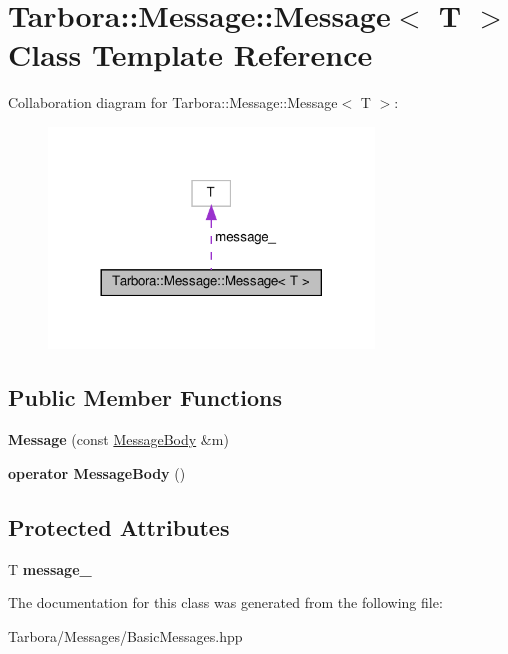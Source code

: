 \hypertarget{classTarbora_1_1Message_1_1Message}{}\section{Tarbora\+:\+:Message\+:\+:Message$<$ T $>$ Class Template Reference}
\label{classTarbora_1_1Message_1_1Message}


Collaboration diagram for Tarbora\+:\+:Message\+:\+:Message$<$ T $>$\+:\nopagebreak
\begin{figure}[H]
\begin{center}
\leavevmode
\includegraphics[width=245pt]{classTarbora_1_1Message_1_1Message__coll__graph}
\end{center}
\end{figure}
\subsection*{Public Member Functions}
\begin{DoxyCompactItemize}
\item 
\mbox{\label{classTarbora_1_1Message_1_1Message_a0c17b7278a56bc8793de569e5fc386b2}} 
{\bfseries Message} (const \hyperlink{classTarbora_1_1MessageBody}{Message\+Body} \&m)
\item 
\mbox{\label{classTarbora_1_1Message_1_1Message_ae78ff052422996d5f310ca6253c2b0a5}} 
{\bfseries operator Message\+Body} ()
\end{DoxyCompactItemize}
\subsection*{Protected Attributes}
\begin{DoxyCompactItemize}
\item 
\mbox{\label{classTarbora_1_1Message_1_1Message_a31c0ef53411e867f140c66676673c2ab}} 
T {\bfseries message\+\_\+}
\end{DoxyCompactItemize}


The documentation for this class was generated from the following file\+:\begin{DoxyCompactItemize}
\item 
Tarbora/\+Messages/Basic\+Messages.\+hpp\end{DoxyCompactItemize}
